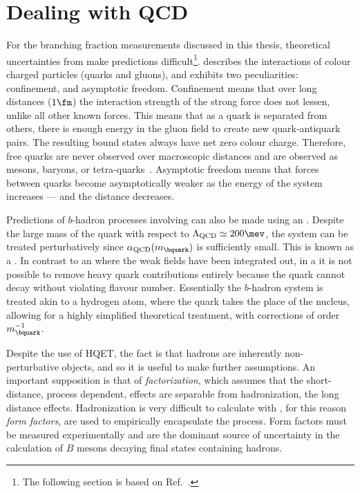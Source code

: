 \section{Dealing with QCD}

For the branching fraction measurements discussed in this thesis, theoretical uncertainties from \QCD make
predictions difficult\footnote{
  The following section is based on Ref.~\cite{Pich:1998xt}.
}.
\QCD describes the interactions of colour charged particles (quarks and
gluons),
and exhibits two peculiarities: confinement, and asymptotic freedom.
Confinement means that over long distances (\approx$1\fm$)
the interaction strength of the strong force does not lessen, unlike all other known
forces.
This means that as a quark is separated from others, there is enough energy in the gluon field to
create new quark-antiquark pairs.
The resulting bound states always have net zero colour charge.
Therefore, free quarks are never observed over macroscopic distances
and are observed as mesons, baryons, or tetra-quarks~\cite{LHCb-PAPER-2014-014}.
Asymptotic freedom means that forces between quarks become asymptotically weaker as the energy of
the system increases --- and the distance decreases.

Predictions of $b$-hadron processes involving \QCD can also be made using an \EFT.
Despite the large mass of the \bquark quark with respect to $\Lambda_\mathrm{QCD}\simeq200\mev$,
the system can be treated perturbatively since $\alpha_\mathrm{QCD}(m_\bquark)$ is sufficiently
small.
This is known as a \HQET.
In contrast to an \EFT where the weak fields have been integrated out, in a \HQET
it is not possible to remove heavy quark contributions entirely because the \bquark quark
cannot decay without violating flavour number.
Essentially the $b$-hadron system is treated akin to a hydrogen atom, where the \bquark quark takes
the place of the nucleus, allowing for a highly simplified theoretical treatment, with corrections
of order $m_\bquark^{-1}$.

Despite the use of \gls{HQET}, the fact is that hadrons are inherently non-perturbative objects,
and so it is useful to make further assumptions.
An important supposition is that of \emph{factorization}, which assumes that the short-distance,
process dependent, \QCD effects are separable from hadronization, the long distance effects.
Hadronization is very difficult to calculate with \QCD, for this reason \emph{form factors}, are
used to empirically encapsulate the process.
Form factors must be measured experimentally and are the dominant source of uncertainty in the
calculation of $B$ mesons decaying final states containing hadrons.





